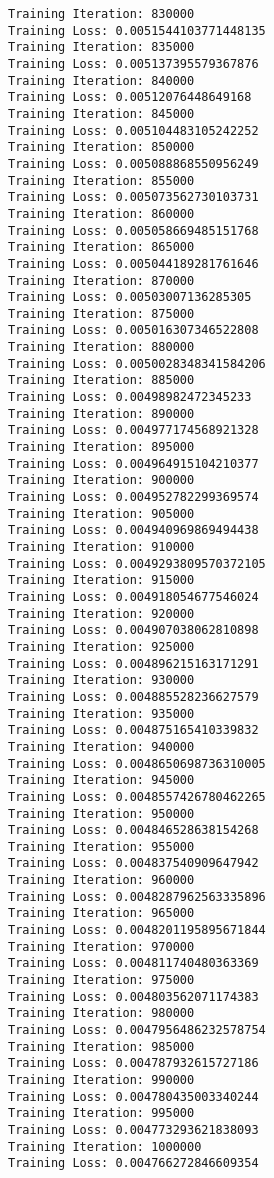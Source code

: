 \documentclass[11pt]{article}
\begin{document}
\begin{Verbatim}[commandchars=\\\{\}]
Training Iteration: 830000
Training Loss: 0.0051544103771448135
Training Iteration: 835000
Training Loss: 0.005137395579367876
Training Iteration: 840000
Training Loss: 0.00512076448649168
Training Iteration: 845000
Training Loss: 0.005104483105242252
Training Iteration: 850000
Training Loss: 0.005088868550956249
Training Iteration: 855000
Training Loss: 0.005073562730103731
Training Iteration: 860000
Training Loss: 0.005058669485151768
Training Iteration: 865000
Training Loss: 0.005044189281761646
Training Iteration: 870000
Training Loss: 0.00503007136285305
Training Iteration: 875000
Training Loss: 0.005016307346522808
Training Iteration: 880000
Training Loss: 0.0050028348341584206
Training Iteration: 885000
Training Loss: 0.00498982472345233
Training Iteration: 890000
Training Loss: 0.004977174568921328
Training Iteration: 895000
Training Loss: 0.004964915104210377
Training Iteration: 900000
Training Loss: 0.004952782299369574
Training Iteration: 905000
Training Loss: 0.004940969869494438
Training Iteration: 910000
Training Loss: 0.0049293809570372105
Training Iteration: 915000
Training Loss: 0.004918054677546024
Training Iteration: 920000
Training Loss: 0.004907038062810898
Training Iteration: 925000
Training Loss: 0.004896215163171291
Training Iteration: 930000
Training Loss: 0.004885528236627579
Training Iteration: 935000
Training Loss: 0.004875165410339832
Training Iteration: 940000
Training Loss: 0.0048650698736310005
Training Iteration: 945000
Training Loss: 0.0048557426780462265
Training Iteration: 950000
Training Loss: 0.004846528638154268
Training Iteration: 955000
Training Loss: 0.004837540909647942
Training Iteration: 960000
Training Loss: 0.0048287962563335896
Training Iteration: 965000
Training Loss: 0.0048201195895671844
Training Iteration: 970000
Training Loss: 0.004811740480363369
Training Iteration: 975000
Training Loss: 0.004803562071174383
Training Iteration: 980000
Training Loss: 0.0047956486232578754
Training Iteration: 985000
Training Loss: 0.004787932615727186
Training Iteration: 990000
Training Loss: 0.004780435003340244
Training Iteration: 995000
Training Loss: 0.004773293621838093
Training Iteration: 1000000
Training Loss: 0.004766272846609354

    \end{Verbatim}
\end{document}

